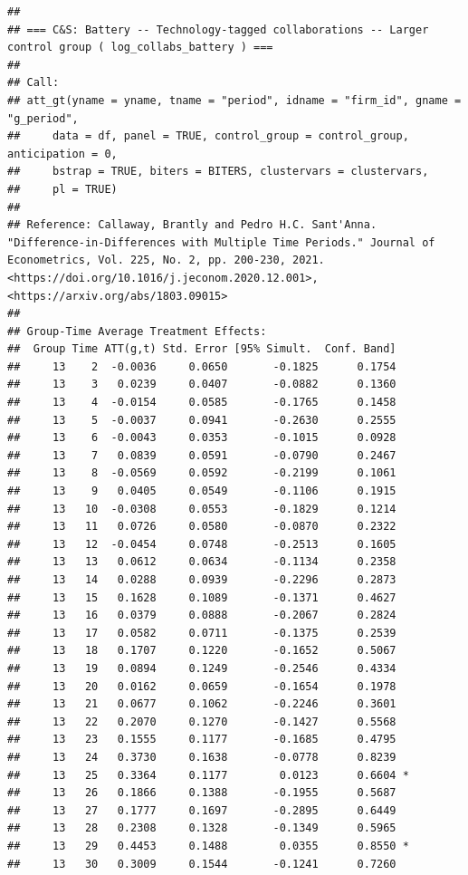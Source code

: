 \documentclass[
]{article}
\begin{document}
\begin{verbatim}
## 
## === C&S: Battery -- Technology-tagged collaborations -- Larger control group ( log_collabs_battery ) ===
## 
## Call:
## att_gt(yname = yname, tname = "period", idname = "firm_id", gname = "g_period", 
##     data = df, panel = TRUE, control_group = control_group, anticipation = 0, 
##     bstrap = TRUE, biters = BITERS, clustervars = clustervars, 
##     pl = TRUE)
## 
## Reference: Callaway, Brantly and Pedro H.C. Sant'Anna.  "Difference-in-Differences with Multiple Time Periods." Journal of Econometrics, Vol. 225, No. 2, pp. 200-230, 2021. <https://doi.org/10.1016/j.jeconom.2020.12.001>, <https://arxiv.org/abs/1803.09015> 
## 
## Group-Time Average Treatment Effects:
##  Group Time ATT(g,t) Std. Error [95% Simult.  Conf. Band]  
##     13    2  -0.0036     0.0650       -0.1825      0.1754  
##     13    3   0.0239     0.0407       -0.0882      0.1360  
##     13    4  -0.0154     0.0585       -0.1765      0.1458  
##     13    5  -0.0037     0.0941       -0.2630      0.2555  
##     13    6  -0.0043     0.0353       -0.1015      0.0928  
##     13    7   0.0839     0.0591       -0.0790      0.2467  
##     13    8  -0.0569     0.0592       -0.2199      0.1061  
##     13    9   0.0405     0.0549       -0.1106      0.1915  
##     13   10  -0.0308     0.0553       -0.1829      0.1214  
##     13   11   0.0726     0.0580       -0.0870      0.2322  
##     13   12  -0.0454     0.0748       -0.2513      0.1605  
##     13   13   0.0612     0.0634       -0.1134      0.2358  
##     13   14   0.0288     0.0939       -0.2296      0.2873  
##     13   15   0.1628     0.1089       -0.1371      0.4627  
##     13   16   0.0379     0.0888       -0.2067      0.2824  
##     13   17   0.0582     0.0711       -0.1375      0.2539  
##     13   18   0.1707     0.1220       -0.1652      0.5067  
##     13   19   0.0894     0.1249       -0.2546      0.4334  
##     13   20   0.0162     0.0659       -0.1654      0.1978  
##     13   21   0.0677     0.1062       -0.2246      0.3601  
##     13   22   0.2070     0.1270       -0.1427      0.5568  
##     13   23   0.1555     0.1177       -0.1685      0.4795  
##     13   24   0.3730     0.1638       -0.0778      0.8239  
##     13   25   0.3364     0.1177        0.0123      0.6604 *
##     13   26   0.1866     0.1388       -0.1955      0.5687  
##     13   27   0.1777     0.1697       -0.2895      0.6449  
##     13   28   0.2308     0.1328       -0.1349      0.5965  
##     13   29   0.4453     0.1488        0.0355      0.8550 *
##     13   30   0.3009     0.1544       -0.1241      0.7260  

\end{verbatim}
\end{document}
